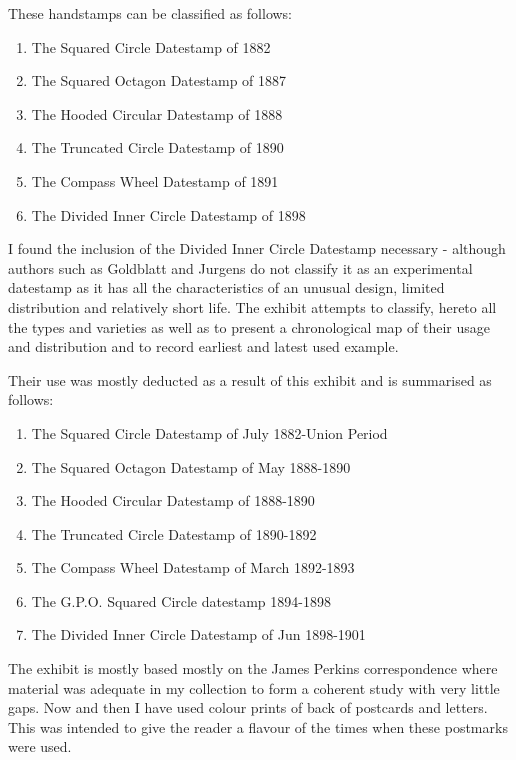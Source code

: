 These handstamps can be classified as follows:

   
\begin{enumerate}
\item The Squared Circle Datestamp of 1882
\item The Squared Octagon Datestamp of 1887
\item The Hooded Circular Datestamp of 1888
\item The Truncated Circle Datestamp of 1890
\item The Compass Wheel Datestamp of 1891
\item The Divided Inner Circle Datestamp of 1898
\end{enumerate}

I found the inclusion of the Divided Inner Circle Datestamp necessary - 
although authors such as Goldblatt and Jurgens do not classify 
it as an experimental datestamp  as it has all the characteristics 
of an unusual design, limited distribution and relatively short life. 
The exhibit attempts to classify, hereto all the types and varieties 
as well as to present a chronological map of their usage and 
distribution and to record earliest and latest used example.

Their use was mostly deducted as a result of this exhibit and is 
summarised as follows:



\begin{enumerate}
\item The Squared Circle Datestamp of July 1882-Union Period
\item The Squared Octagon Datestamp of May 1888-1890
\item The Hooded Circular Datestamp of 1888-1890
\item The Truncated Circle Datestamp of 1890-1892
\item The Compass Wheel Datestamp of March 1892-1893
\item The G.P.O. Squared Circle datestamp 1894-1898
\item The Divided Inner Circle Datestamp of Jun 1898-1901
\end{enumerate}

The exhibit is mostly based mostly on the James Perkins correspondence 
where material was adequate in my collection to form a coherent study with very 
little gaps. Now and then I have used colour prints of back of postcards and letters. 
This was intended to give the reader a flavour of the times when these 
postmarks were used.

                                                                                                                                              


 

 
                                